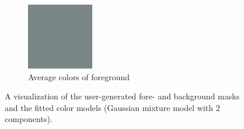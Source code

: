 \documentclass[a4paper]{article}
\begin{document}
\begin{figure}[ht]
\begin{subfigure}[h]{0.48\textwidth}
	\includegraphics[width=0.32\textwidth]{imgs/foregroundMean3_cars.png}
	\caption*{Average colors of foreground}
	\end{subfigure}
\caption{A visualization of the user-generated fore- and background masks and the fitted color models (Gaussian mixture model with 2 components).}
\label{fig:cars}
\end{figure}
\end{document}
